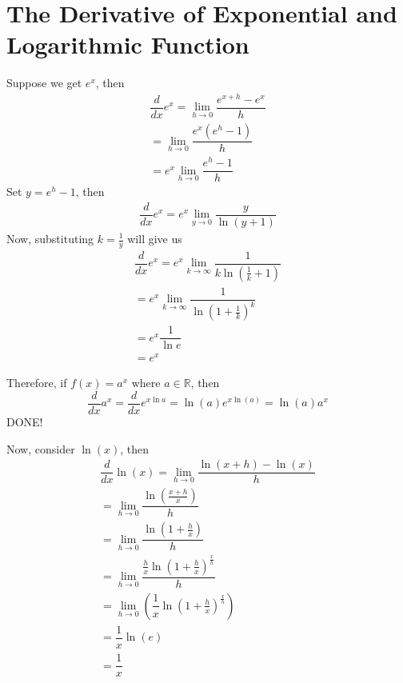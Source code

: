 \documentclass{article}
\theoremstyle{definition}
\theoremstyle{definition}
\theoremstyle{definition}
\theoremstyle{definition}
\theoremstyle{definition}
\theoremstyle{definition}
\theoremstyle{definition}
\theoremstyle{definition}
\theoremstyle{definition}
\begin{document}

\section{The Derivative of Exponential and Logarithmic Function}
Suppose we get $e^x$, then
\begin{align*}
    \dfrac{d}{dx}e^x=\lim_{h\to 0}\dfrac{e^{x+h}-e^x}{h}\\
    =\lim_{h\to 0}\dfrac{e^x(e^h-1)}{h}\\
    =e^x\lim_{h\to 0}\dfrac{e^h-1}{h}
\end{align*}
Set $y=e^h-1$, then
\begin{align*}
    \dfrac{d}{dx}e^x=e^x\lim_{y\to0}\dfrac{y}{\ln(y+1)}
\end{align*}
Now, substituting $k=\frac{1}{y}$ will give us
\begin{align*}
    \dfrac{d}{dx}e^x=e^x\lim_{k\to\infty}\dfrac{1}{k\ln\left(\frac{1}{k}+1\right)}\\
    =e^x\lim_{k\to\infty}\dfrac{1}{\ln\left(1+\frac{1}{k}\right)^k}\\
    =e^x\dfrac{1}{\ln e}\\
    =e^x
\end{align*}

Therefore, if $f(x)=a^x$ where $a\in\mathbb{R}$, then
\[
\dfrac{d}{dx}a^x=\dfrac{d}{dx}e^{x\ln a}=\ln(a)e^{x\ln(a)}=\ln(a)a^x
\]
DONE!

Now, consider $\ln(x)$, then
\begin{align*}
    \dfrac{d}{dx}\ln(x)=\lim_{h\to 0}\dfrac{\ln(x+h)-\ln(x)}{h}\\
    =\lim_{h\to 0}\dfrac{\ln\left(\frac{x+h}{x}\right)}{h}\\
    =\lim_{h\to 0}\dfrac{\ln\left(1+\frac{h}{x}\right)}{h}\\
    =\lim_{h\to 0}\dfrac{\frac{h}{x}\ln\left(1+\frac{h}{x}\right)^{\frac{x}{h}}}{h}\\
    =\lim_{h\to 0}\left(\dfrac{1}{x}\ln\left(1+\frac{h}{x}\right)^{\frac{x}{h}}\right)\\
    =\dfrac{1}{x}\ln(e)\\
    =\dfrac{1}{x}
\end{align*}
\end{document}
